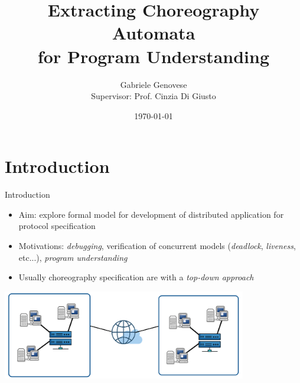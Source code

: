 \documentclass{beamer}
\title{Extracting Choreography Automata \\ for Program Understanding}
\author{Gabriele Genovese \\ Supervisor: Prof. Cinzia Di Giusto}
\date{\today}
\begin{document}
\frame{\titlepage}

%


\section{Introduction}
\begin{frame}{Introduction}
\begin{itemize}
    \item Aim: explore formal model for development of 
    distributed application for protocol specification
    \item Motivations: \textit{debugging}, verification of 
    concurrent models (\textit{deadlock}, \textit{liveness}, etc...), 
    \textit{program understanding}
    \item Usually choreography specification are with a \textit{top-down approach}
\end{itemize}
\begin{center}
\includegraphics[width=0.8\textwidth]{images/crop.png}
\end{center}
\end{frame}
\end{document}
